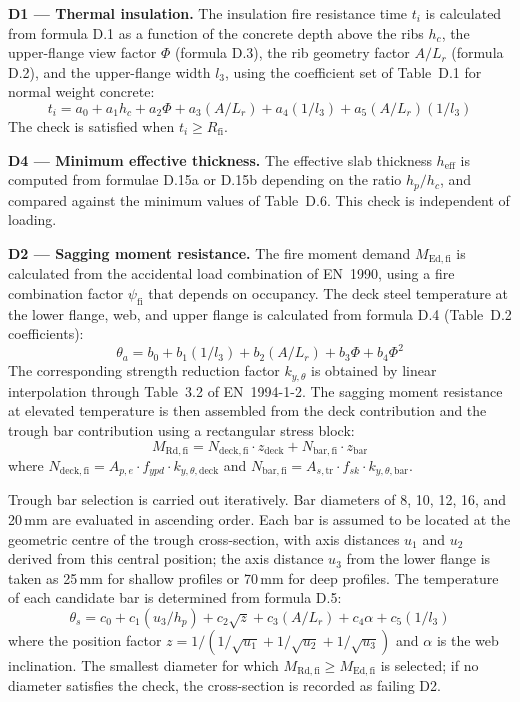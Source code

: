 \textbf{D1 --- Thermal insulation.} The insulation fire resistance time $t_i$ is calculated from formula D.1 as a function of the concrete depth above the ribs $h_c$, the upper-flange view factor $\Phi$ (formula D.3), the rib geometry factor $A/L_r$ (formula D.2), and the upper-flange width $l_3$, using the coefficient set of Table~D.1 for normal weight concrete:
\begin{equation}
    t_i = a_0 + a_1 h_c + a_2 \Phi + a_3 (A/L_r) + a_4 (1/l_3) + a_5 (A/L_r)(1/l_3)
    \label{eq:fire_d1}
\end{equation}
The check is satisfied when $t_i \ge R_\mathrm{fi}$.

\textbf{D4 --- Minimum effective thickness.} The effective slab thickness $h_\mathrm{eff}$ is computed from formulae D.15a or D.15b depending on the ratio $h_p/h_c$, and compared against the minimum values of Table~D.6. This check is independent of loading.

\textbf{D2 --- Sagging moment resistance.} The fire moment demand $M_\mathrm{Ed,fi}$ is calculated from the accidental load combination of EN~1990, using a fire combination factor $\psi_\mathrm{fi}$ that depends on occupancy. The deck steel temperature at the lower flange, web, and upper flange is calculated from formula D.4 (Table~D.2 coefficients):
\begin{equation}
    \theta_a = b_0 + b_1 (1/l_3) + b_2 (A/L_r) + b_3 \Phi + b_4 \Phi^2
    \label{eq:fire_d4}
\end{equation}
The corresponding strength reduction factor $k_{y,\theta}$ is obtained by linear interpolation through Table~3.2 of EN~1994-1-2. The sagging moment resistance at elevated temperature is then assembled from the deck contribution and the trough bar contribution using a rectangular stress block:
\begin{equation}
    M_\mathrm{Rd,fi} = N_\mathrm{deck,fi} \cdot z_\mathrm{deck} + N_\mathrm{bar,fi} \cdot z_\mathrm{bar}
    \label{eq:mrd_fi}
\end{equation}
where $N_\mathrm{deck,fi} = A_{p,e} \cdot f_{ypd} \cdot k_{y,\theta,\mathrm{deck}}$ and $N_\mathrm{bar,fi} = A_{s,\mathrm{tr}} \cdot f_{sk} \cdot k_{y,\theta,\mathrm{bar}}$.

Trough bar selection is carried out iteratively. Bar diameters of 8, 10, 12, 16, and 20\,mm are evaluated in ascending order. Each bar is assumed to be located at the geometric centre of the trough cross-section, with axis distances $u_1$ and $u_2$ derived from this central position; the axis distance $u_3$ from the lower flange is taken as 25\,mm for shallow profiles or 70\,mm for deep profiles. The temperature of each candidate bar is determined from formula D.5:
\begin{equation}
    \theta_s = c_0 + c_1 (u_3/h_p) + c_2 \sqrt{z} + c_3 (A/L_r) + c_4 \alpha + c_5 (1/l_3)
    \label{eq:fire_d5}
\end{equation}
where the position factor $z = 1/(1/\sqrt{u_1} + 1/\sqrt{u_2} + 1/\sqrt{u_3})$ and $\alpha$ is the web inclination. The smallest diameter for which $M_\mathrm{Rd,fi} \ge M_\mathrm{Ed,fi}$ is selected; if no diameter satisfies the check, the cross-section is recorded as failing D2.

